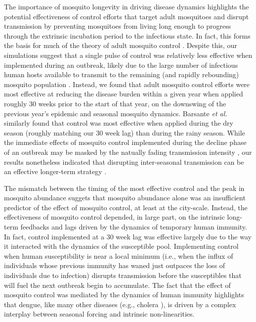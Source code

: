 \documentclass[10pt,letterpaper]{article}
\begin{document}
The importance of mosquito longevity in driving disease dynamics highlights the potential effectiveness of control efforts that target adult mosquitoes and disrupt transmission by preventing mosquitoes from living long enough to progress through the extrinsic incubation period to the infectious state.
In fact, this forms the basis for much of the theory of adult mosquito control \cite{Burattini2008, Morrison2008, Smith2012}.
Despite this, our simulations suggest that a single pulse of control was relatively less effective when implemented during an outbreak, likely due to the large number of infectious human hosts available to transmit to the remaining (and rapidly rebounding) mosquito population \cite{Newton1992, Burattini2008}.
Instead, we found that adult mosquito control efforts were most effective at reducing the disease burden within a given year when applied roughly 30 weeks prior to the start of that year, on the downswing of the previous year's epidemic and seasonal mosquito dynamics.
Barsante \emph{et al.} \cite{Barsante2015} similarly found that control was most effective when applied during the dry season (roughly matching our 30 week lag) than during the rainy season.
While the immediate effects of mosquito control implemented during the decline phase of an outbreak may be masked by the natually fading transmission intensity \cite{Stoddard2014}, our results nonetheless indicated that disrupting inter-seasonal transmission can be an effective longer-term strategy \cite{Hladish2018}.

The mismatch between the timing of the most effective control and the peak in mosquito abundance suggets that mosquito abundance alone was an insufficient predictor of the effect of mosquito control, at least at the city-scale.
Instead, the effectiveness of mosquito control depended, in large part, on the intrinsic long-term feedbacks and lags driven by the dynamics of temporary human immunity.
In fact, control implemented at a 30 week lag was effective largely due to the way it interacted with the dynamics of the susceptible pool. 
Implementing control when human susceptibility is near a local minimum (i.e., when the influx of individuals whose previous immunity has waned just outpaces the loss of individuals due to infection) disrupts transmission before the susceptibles that will fuel the next outbreak begin to accumulate.
The fact that the effect of mosquito control was mediated by the dynamics of human immunity highlights that dengue, like many other diseases (e.g., cholera \cite{Koelle2004, Koelle2005}), is driven by a complex interplay between seasonal forcing and intrinsic non-linearities.
\end{document}
